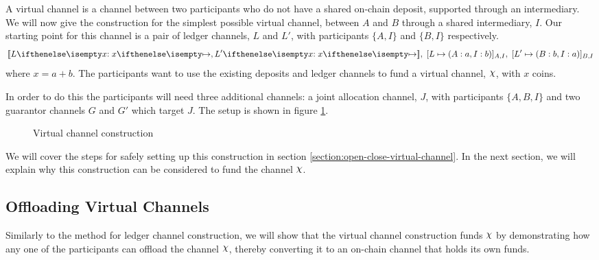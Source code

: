\documentclass{article}
\begin{document}
A virtual channel is a channel between two participants who do not have a shared on-chain deposit, supported through an intermediary.
We will now give the construction for the simplest possible virtual channel, between $A$ and $B$ through a shared intermediary, $I$.
Our starting point for this channel is a pair of ledger channels, $L$ and $L'$, with participants $\{A,I\}$ and $\{B,I\}$ respectively.
\begin{align}
  \adj{\holds{L}{x}{}, \holds{L'}{x}{}}, \; \finalizable{L}{\alloc{A:a, I:b}}{A, I}, \; \finalizable{L'}{\alloc{B: b, I: a}}{B, I} \label{eq:virtual-channel-start-state}
\end{align}
where $x = a + b$.
The participants want to use the existing deposits and ledger channels to fund a virtual channel, $\rchi$, with $x$ coins.

In order to do this the participants will need three additional channels: a joint allocation channel, $J$, with participants $\{A, B, I\}$ and two guarantor channels $G$ and $G'$ which target $J$. The setup is shown in figure \ref{fig:virtual-channel-construction}.

\begin{figure}[ht]
  \centering
  
  \caption{Virtual channel construction}
  \label{fig:virtual-channel-construction}
\end{figure}

We will cover the steps for safely setting up this construction in section \ref{section:open-close-virtual-channel}. 
In the next section, we will explain why this construction can be considered to fund the channel $\rchi$.

\subsection{Offloading Virtual Channels}

Similarly to the method for ledger channel construction, we will show that the virtual channel construction funds $\rchi$ by demonstrating how any one of the participants can offload the channel $\rchi$, thereby converting it to an on-chain channel that holds its own funds.
\end{document}
